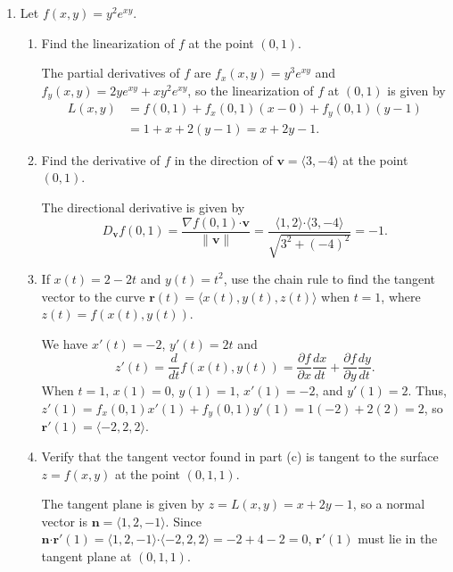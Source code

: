 \documentclass[12pt]{article}
\newcommand{\points}[1]{\marginpar{\hspace{24pt}[#1]}}
\newcommand{\dotp}{\boldsymbol{\cdot}}
\newcommand{\pd}[2]{\frac{\partial #1}{\partial #2}}
\newcommand{\rd}[2]{\frac{d #1}{d #2}}
\begin{document}
\begin{enumerate}
\item Let $f(x,y) = y^2e^{xy}$.
\begin{enumerate}
\item Find the linearization of $f$ at the point $(0,1)$. \points{4}


\bigskip

The partial derivatives of $f$ are $f_x(x,y) = y^3e^{xy}$ and $f_y(x,y) = 2ye^{xy}+xy^2e^{xy}$, so the linearization of $f$ at $(0,1)$ is given by
\begin{align*}
L(x,y) & = f(0,1)+f_x(0,1)(x-0)+f_y(0,1)(y-1)\\
& = 1+x+2(y-1) = x+2y-1.
\end{align*}

\bigskip

\bigskip

\item Find the derivative of $f$ in the direction of $\mathbf{v} = \langle 3,-4\rangle$ at the point $(0,1)$. \points{3}

\bigskip

The directional derivative is given by 
\[
D_{\mathbf{v}}f(0,1) = \frac{\nabla f(0,1)\dotp \mathbf{v}}{\lVert \mathbf{v}\rVert} = \frac{\langle 1,2\rangle \dotp \langle 3,-4\rangle}{\sqrt{3^2+(-4)^2}} = -1.
\]

\bigskip


\item If $x(t)=2-2t$ and $y(t) = t^2$, use the chain rule to find the tangent vector to the curve $\mathbf{r}(t) = \langle x(t),y(t),z(t)\rangle$ when $t=1$, where $z(t)=f(x(t),y(t))$. \points{5}

\bigskip

We have $x'(t) = -2$, $y'(t) = 2t$ and
\[
z'(t) = \frac{d}{dt}f(x(t),y(t)) = \pd{f}{x}\rd{x}{t}+\pd{f}{y}\rd{y}{t}.
\]
When $t=1$, $x(1)=0$, $y(1)=1$, $x'(1)=-2$, and $y'(1) = 2$. Thus, $z'(1) = f_x(0,1)x'(1)+f_y(0,1)y'(1) = 1(-2)+2(2)=2$, so $\mathbf{r}'(1) = \langle -2,2,2\rangle$.

\bigskip

\item Verify that the tangent vector found in part (c) is tangent to the surface $z=f(x,y)$ at the point $(0,1,1)$. \points{3}

\bigskip

The tangent plane is given by $z=L(x,y) = x+2y-1$, so a normal vector is $\mathbf{n} = \langle 1,2,-1\rangle$. Since $\mathbf{n}\dotp \mathbf{r}'(1) = \langle 1,2,-1\rangle\dotp \langle -2,2,2\rangle = -2+4-2=0$, $\mathbf{r}'(1)$ must lie in the tangent plane at $(0,1,1)$.
\end{enumerate}
\newpage


\end{enumerate}
\end{document}
